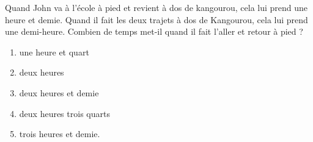 Quand John va à l'école à pied et revient à dos de kangourou, cela lui prend une heure et demie. Quand il fait les deux trajets à dos de Kangourou, cela lui prend une demi-heure. Combien de temps met-il quand il fait l'aller et retour à pied ?
\begin{multicols}{3}
  \begin{enumerate}[A/]
  \item une heure et quart
  \item deux heures
  \item deux heures et demie
  \item deux heures trois quarts
  \item trois heures et demie.
  \end{enumerate}
\end{multicols}